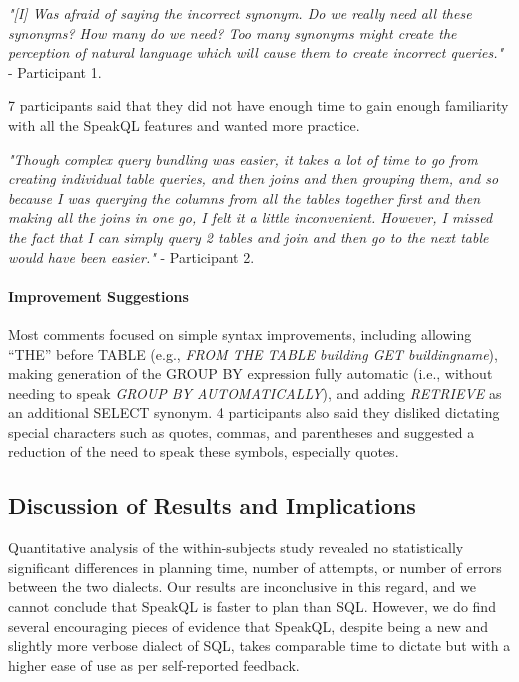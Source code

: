 \vspace{1mm}
\emph{"[I] Was afraid of saying the incorrect synonym. Do we really need all these synonyms? How many do we need? Too many synonyms might create the perception of natural language which will cause them to create incorrect queries."}
- Participant 1.

\vspace{1mm}
7 participants said that they did not have enough time to gain enough familiarity with all the SpeakQL features and  wanted more practice. 

\vspace{1mm}
\emph{"Though complex query bundling was easier, it takes a lot of time to go from creating individual table queries, and then joins and then grouping them, and so because I was querying the columns from all the tables together first and then making all the joins in one go, I felt it a little inconvenient. However, I missed the fact that I can simply query 2 tables and join and then go to the next table would have been easier."}
- Participant 2.

\paragraph{\textbf{Improvement Suggestions}} 
Most comments focused on simple syntax improvements, including allowing ``THE'' before TABLE (e.g., \emph{FROM THE TABLE building GET buildingname}), making generation of the GROUP BY expression fully automatic (i.e., without needing to speak \emph{GROUP BY AUTOMATICALLY}), and adding \emph{RETRIEVE} as an additional SELECT synonym. 
4 participants also said they disliked dictating special characters such as quotes, commas, and parentheses and suggested a reduction of the need to speak these symbols, especially quotes.


\subsection{Discussion of Results and Implications}

Quantitative analysis of the within-subjects study revealed no statistically significant differences in planning time, number of attempts, or number of errors between the two dialects. Our results are inconclusive in this regard, and we cannot conclude that SpeakQL is faster to plan than SQL. However, we do find several encouraging pieces of evidence that SpeakQL, despite being a new and slightly more verbose dialect of SQL, takes comparable time to dictate but with a higher ease of use as per self-reported feedback. 

